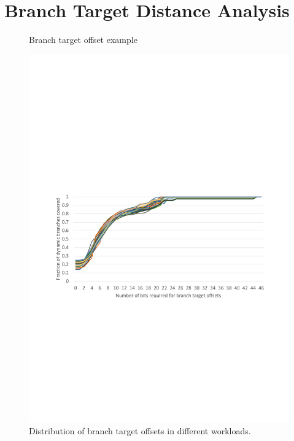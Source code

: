 \section{Branch Target Distance Analysis}
\label{sec:analysis}

\begin{figure}[b]
  \sffamily
  \centering
  \caption{\label{fig:concat} Branch target offset example}
\end{figure}

\begin{figure}[t!]
    \centering
    \includegraphics[width=\textwidth, trim=60 280 50 320, clip]{figures/offset_distribution.pdf}
    \caption{Distribution of branch target offsets in different workloads.}
    \label{fig:offsets}
\end{figure}



